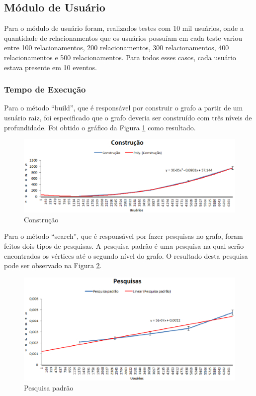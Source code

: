\subsection{Módulo de Usuário}

Para o módulo de usuário foram, realizados testes com 10 mil usuários, onde a quantidade de relacionamentos que os usuários possuíam em cada teste variou entre 100 relacionamentos, 200 relacionamentos, 300 relacionamentos, 400 relacionamentos e 500 relacionamentos. Para todos esses casos, cada usuário estava presente em 10 eventos.

\subsubsection{Tempo de Execução}

Para o método ``build'', que é responsável por construir o grafo a partir de um usuário raiz, foi especificado que o grafo deveria ser construído com três níveis de profundidade. Foi obtido o gráfico da Figura \ref{build_tempo} como resultado.

\begin{figure}[!h]
	\centering
	\includegraphics[scale=0.8]{figuras/resultados/graficos/construcao_tempo.eps}
	\caption[Construção]{Construção}
	\label{build_tempo}
\end{figure}

Para o método ``search'', que é responsável por fazer pesquisas no grafo, foram feitos dois tipos de pesquisas. A pesquisa padrão é uma pesquisa na qual serão encontrados os vértices até o segundo nível do grafo. O resultado desta pesquisa pode ser observado na Figura \ref{pesquisa_padrao}.

\newpage

\begin{figure}[!h]
	\centering
	\includegraphics[scale=0.8]{figuras/resultados/graficos/pesquisa_padrao.eps}
	\caption[Pesquisas]{Pesquisa padrão}
	\label{pesquisa_padrao}
\end{figure}

